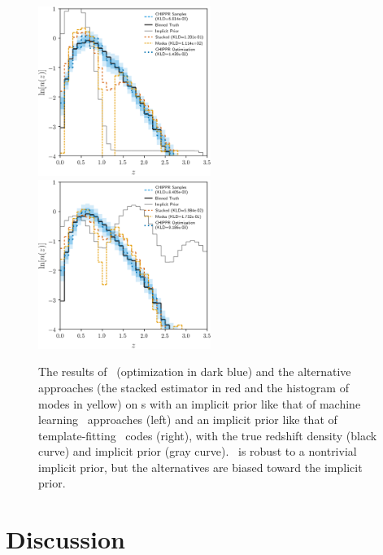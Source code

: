 \begin{figure}
	\includegraphics[width=0.5\textwidth]{figures/chippr/results_trpr.png}
	\includegraphics[width=0.5\textwidth]{figures/chippr/results_tmpr.png}
	\caption{
		The results of \Chippr\ (optimization in dark blue) and the alternative approaches (the stacked estimator in red and the histogram of modes in yellow) on \pzpdf s with an implicit prior like that of machine learning \pzpdf\ approaches (left) and an implicit prior like that of template-fitting \pzpdf\ codes (right), with the true redshift density (black curve) and implicit prior (gray curve).
		\Chippr\ is robust to a nontrivial implicit prior, but the alternatives are biased toward the implicit prior.
	}
\end{figure}

\section{Discussion}



